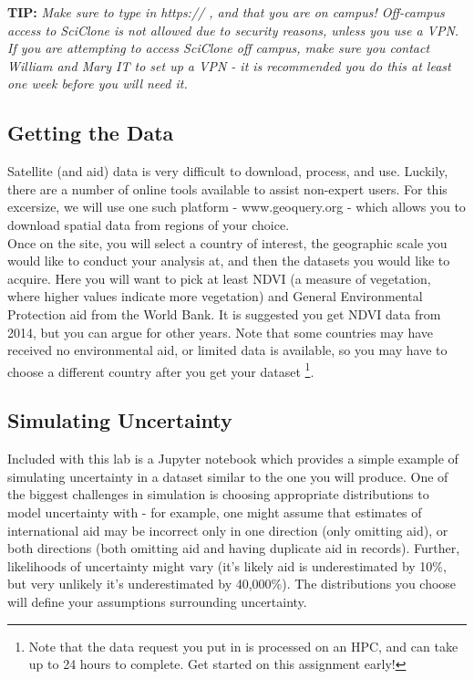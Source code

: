 \documentclass[a4paper, 11pt]{article}
\begin{document}
\textbf{TIP:} \textit{Make sure to type in https:// , and that you are on campus!  Off-campus access to SciClone is not allowed due to security reasons, unless you use a VPN. If you are attempting to access SciClone off campus, make sure you contact William and Mary IT to set up a VPN - it is recommended you do this at least one week before you will need it.}
\vspace{0.1in}

\subsection{Getting the Data}
Satellite (and aid) data is very difficult to download, process, and use.  Luckily, there are a number of online tools available to assist non-expert users.  For this excersize, we will use one such platform - www.geoquery.org - which allows you to download spatial data from regions of your choice.\\
Once on the site, you will select a country of interest, the geographic scale you would like to conduct your analysis at, and then the datasets you would like to acquire.  Here you will want to pick at least NDVI (a measure of vegetation, where higher values indicate more vegetation) and General Environmental Protection aid from the World Bank.  It is suggested you get NDVI data from 2014, but you can argue for other years.  Note that some countries may have received no environmental aid, or limited data is available, so you may have to choose a different country after you get your dataset \footnote{Note that the data request you put in is processed on an HPC, and can take up to 24 hours to complete.  Get started on this assignment early!}.

\subsection{Simulating Uncertainty}
Included with this lab is a Jupyter notebook which provides a simple example of simulating uncertainty in a dataset similar to the one you will produce. One of the biggest challenges in simulation is choosing appropriate distributions to model uncertainty with - for example, one might assume that estimates of international aid may be incorrect only in one direction (only omitting aid), or both directions (both omitting aid and having duplicate aid in records).  Further, likelihoods of uncertainty might vary (it's likely aid is underestimated by 10\%, but very unlikely it's underestimated by 40,000\%).  The distributions you choose will define your assumptions surrounding uncertainty.
\end{document}
